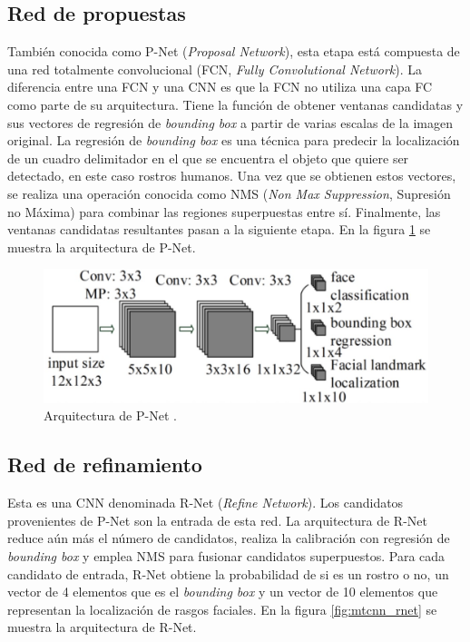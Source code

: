 \subsection{Red de propuestas}
También conocida como P-Net (\textit{Proposal Network}), esta etapa está compuesta de una red totalmente convolucional (FCN, \textit{Fully Convolutional Network}). La diferencia entre una FCN y una CNN es que la FCN no utiliza una capa FC como parte de su arquitectura. Tiene la función de obtener ventanas candidatas y sus vectores de regresión de \textit{bounding box} a partir de varias escalas de la imagen original. La regresión de \textit{bounding box} es una técnica para predecir la localización de un cuadro delimitador en el que se encuentra el objeto que quiere ser detectado, en este caso rostros humanos. Una vez que se obtienen estos vectores, se realiza una operación conocida como NMS (\textit{Non Max Suppression}, Supresión no Máxima) para combinar las regiones superpuestas entre sí. Finalmente, las ventanas candidatas resultantes pasan a la siguiente etapa. En la figura \ref{fig:mtcnn_pnet} se muestra la arquitectura de P-Net.

\begin{figure}[h]
	\centering
	\includegraphics[scale=0.25]{./Figures/mtcnn_pnet.png}
	\caption{Arquitectura de P-Net \cite{mtcnn_info}.}
	\label{fig:mtcnn_pnet}
\end{figure}
	
\subsection{Red de refinamiento}
Esta es una CNN denominada R-Net (\textit{Refine Network}). Los candidatos provenientes de P-Net son la entrada de esta red. La arquitectura de R-Net reduce aún más el número de candidatos, realiza la calibración con regresión de \textit{bounding box} y emplea NMS para fusionar candidatos superpuestos. Para cada candidato de entrada, R-Net obtiene la probabilidad de si es un rostro o no, un vector de 4 elementos que es el \textit{bounding box} y un vector de 10 elementos que representan la localización de rasgos faciales. En la figura \ref{fig:mtcnn_rnet} se muestra la arquitectura de R-Net.

